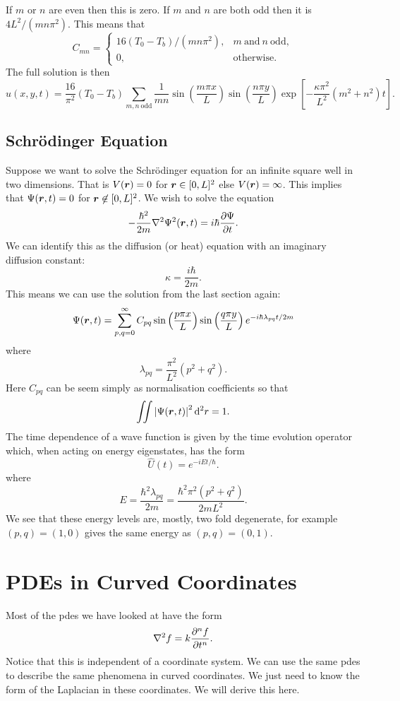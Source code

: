 \documentclass[a4paper]{article}
\begin{document}
    If \(m\) or \(n\) are even then this is zero.
    If \(m\) and \(n\) are both odd then it is \(4L^2/(mn\pi^2)\).
    This means that
    \[
        C_{mn} =
        \begin{cases}
            16(T_0 - T_b)/(mn\pi^2), &m~\text{and}~n~\text{odd},\\
            0, &\text{otherwise}.
        \end{cases}
    \]
    The full solution is then
    \[u(x, y, t) = \frac{16}{\pi^2}(T_0 - T_b)\sum_{m, n~\text{odd}}\frac{1}{mn} \sin\left(\frac{m\pi x}{L}\right) \sin\left(\frac{n\pi y}{L}\right)\exp\left[-\frac{\kappa\pi^2}{L^2}(m^2 + n^2)t\right].\]
    
    \subsection{Schr\"odinger Equation}
    Suppose we want to solve the Schr\"odinger equation for an infinite square well in two dimensions.
    That is \(V(\bm{r}) = 0\) for \(\bm{r}\in[0, L]^2\) else \(V(\bm{r}) = \infty\).
    This implies that \(\Psi(\bm{r}, t) = 0\) for \(\bm{r}\not\in[0, L]^2\).
    We wish to solve the equation
    \[-\frac{\hbar^2}{2m}\nabla^2\Psi^2(\bm{r}, t) = i\hbar\pdv{\Psi}{t}.\]
    We can identify this as the diffusion (or heat) equation with an imaginary diffusion constant:
    \[\kappa = \frac{i\hbar}{2m}.\]
    This means we can use the solution from the last section again:
    \[\Psi(\bm{r}, t) = \sum_{p, q=0}^{\infty} C_{pq}\sin\left(\frac{p\pi x}{L}\right) \sin\left(\frac{q\pi y}{L}\right) e^{-i\hbar\lambda_{pq}t/2m}\]
    where
    \[\lambda_{pq} = \frac{\pi^2}{L^2}(p^2 + q^2).\]
    Here \(C_{pq}\) can be seem simply as normalisation coefficients so that
    \[\iint \abs{\Psi(\bm{r}, t)}^2\dd[2]{r} = 1.\]
    The time dependence of a wave function is given by the time evolution operator which, when acting on energy eigenstates, has the form
    \[\hat{U}(t) = e^{-iEt/\hbar}.\]
    where
    \[E = \frac{\hbar^2\lambda_{pq}}{2m} = \frac{\hbar^2\pi^2(p^2 + q^2)}{2mL^2}.\]
    We see that these energy levels are, mostly, two fold degenerate, for example \((p, q) = (1, 0)\) gives the same energy as \((p, q) = (0, 1)\).
    
    \section{PDEs in Curved Coordinates}
    Most of the \glspl{pde} we have looked at have the form
    \[\nabla^2 f = k\pdv[n]{f}{t}.\]
    Notice that this is independent of a coordinate system.
    We can use the same \glspl{pde} to describe the same phenomena in curved coordinates.
    We just need to know the form of the Laplacian in these coordinates.
    We will derive this here.
    
\end{document}
